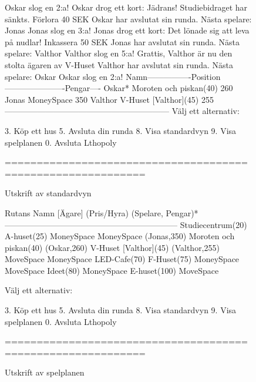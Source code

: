 \begin{figure}[H]
\centering

\begin{REPL}
Oskar slog en 2:a!
Oskar drog ett kort: Jädrans! Studiebidraget har sänkts. Förlora 40 SEK
Oskar har avslutat sin runda.
Nästa spelare: Jonas
Jonas slog en 3:a!
Jonas drog ett kort: Det lönade sig att leva på nudlar! Inkassera 50 SEK
Jonas har avslutat sin runda.
Nästa spelare: Valthor
Valthor slog en 5:a!
Grattis, Valthor är nu den stolta ägaren av V-Huset
Valthor har avslutat sin runda.
Nästa spelare: Oskar
Oskar slog en 2:a!
Namn----------------Position----------------------Pengar----
Oskar*              Moroten och piskan(40)        260       
Jonas               MoneySpace                    350       
Valthor             V-Huset [Valthor](45)         255       
------------------------------------------------------------
Välj ett alternativ:

	3. Köp ett hus                   
	5. Avsluta din runda             
	8. Visa standardvyn              
	9. Visa spelplanen               
	0. Avsluta Lthopoly              

============================================================

\end{REPL}
\caption {Utskrift av standardvyn}
\label{fig:scalajava:lthopoly-team:defaultview}
\end{figure}

\begin{figure}[H]
\centering

\begin{REPL}
Rutans Namn [Ägare] (Pris/Hyra) (Spelare, Pengar)*
---------------------------------------------------------------
Studiecentrum(20)
A-huset(25) 
MoneySpace
MoneySpace (Jonas,350)
Moroten och piskan(40) (Oskar,260)
V-Huset [Valthor](45) (Valthor,255)
MoveSpace
MoneySpace
LED-Cafe(70)
F-Huset(75)
MoneySpace
MoveSpace
Ideet(80)
MoneySpace
E-huset(100)
MoveSpace

Välj ett alternativ:

	3. Köp ett hus                   
	5. Avsluta din runda             
	8. Visa standardvyn              
	9. Visa spelplanen               
	0. Avsluta Lthopoly              

============================================================ 
\end{REPL}

\caption {Utskrift av spelplanen}
\label{fig:scalajava:lthopoly-team:boardview}
\end{figure}


